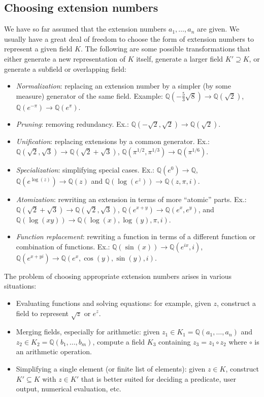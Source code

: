 \documentclass[sigconf,screen,urlbreakonhyphens]{acmart}
\begin{document}
\subsection{Choosing extension numbers}

We have so far assumed that the extension numbers $a_1,\ldots,a_n$
are given. We usually have a great deal of freedom to
choose the form of extension numbers to represent a given field $K$. The following are some possible
transformations that either generate a new representation of $K$ itself,
generate a larger field $K' \supseteq K$, or generate a subfield or overlapping field:

\begin{itemize}
\item \emph{Normalization}: replacing an extension number by a simpler (by some measure) generator of the same field.  Example: $\mathbb{Q}(-\tfrac{5}{3}\sqrt{8}) \to \mathbb{Q}(\sqrt{2})$, $\mathbb{Q}(e^{-\pi}) \to \mathbb{Q}(e^{\pi})$.
\item \emph{Pruning}: removing redundancy. Ex.: $\mathbb{Q}(-\sqrt{2},\sqrt{2}) \to \mathbb{Q}(\sqrt{2})$.
\item \emph{Unification}: replacing extensions by a common generator. Ex.: $\mathbb{Q}(\sqrt{2},\sqrt{3}) \to \mathbb{Q}(\sqrt{2}+\sqrt{3})$, $\mathbb{Q}(\pi^{1/2}, \pi^{1/3}) \to \mathbb{Q}(\pi^{1/6})$.
\item \emph{Specialization}: simplifying special cases. Ex.: $\mathbb{Q}(e^0) \to \mathbb{Q}$, $\mathbb{Q}(e^{\log(z)}) \to \mathbb{Q}(z)$ and $\mathbb{Q}(\log(e^z)) \to \mathbb{Q}(z, \pi, i)$.
\item \emph{Atomization}: rewriting an extension in terms of more ``atomic'' parts. Ex.: $\mathbb{Q}(\sqrt{2}+\sqrt{3}) \to \mathbb{Q}(\sqrt{2},\sqrt{3})$,
$\mathbb{Q}(e^{x+y}) \to \mathbb{Q}(e^x, e^y)$, and $\mathbb{Q}(\log(xy)) \to \mathbb{Q}(\log(x), \log(y), \pi, i)$.
\item \emph{Function replacement}: rewriting a function in terms of a different function or combination of functions. Ex.: $\mathbb{Q}(\sin(x)) \to \mathbb{Q}(e^{ix}, i)$, $\mathbb{Q}(e^{x+yi}) \to \mathbb{Q}(e^x, \cos(y), \sin(y), i)$.
\end{itemize}

The problem of choosing appropriate extension numbers arises in various situations:

\begin{itemize}
\item Evaluating functions and solving equations: for example, given $z$, construct a field to represent $\sqrt{z}$ or $e^z$.
\item Merging fields, especially for arithmetic: given $z_1 \in K_1 = \mathbb{Q}(a_1,\ldots,a_n)$ and $z_2 \in K_2 = \mathbb{Q}(b_1,\ldots,b_m)$, compute a field $K_3$ containing $z_3 = z_1 \circ z_2$ where $\circ$ is an arithmetic operation.
\item Simplifying a single element (or finite list of elements): given $z \in K$, construct $K' \subseteq K$ with $z \in K'$ that is better suited for deciding a predicate, user output, numerical evaluation, etc.
\end{itemize}
\end{document}
